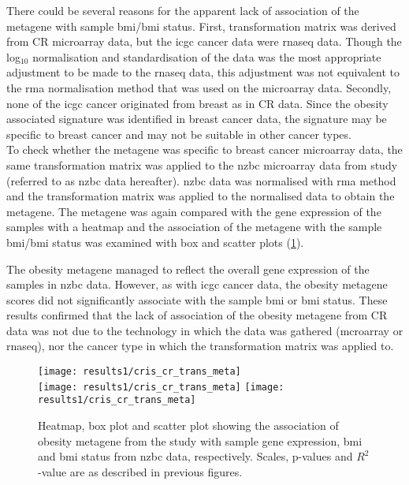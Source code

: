 There could be several reasons for the apparent lack of association of the metagene with sample \gls{bmi}/\gls{bmi} status.
First, transformation matrix was derived from CR microarray data, but the \gls{icgc} cancer data were \gls{rnaseq} data.
Though the log$_{10}$ normalisation and standardisation of the data was the most appropriate adjustment to be made to the \gls{rnaseq} data, this adjustment was not equivalent to the \gls{rma} normalisation method that was used on the microarray data.
Secondly, none of the \gls{icgc} cancer originated from breast as in CR data.
Since the obesity associated signature was identified in breast cancer data, the signature may be specific to breast cancer and may not be suitable in other cancer types.
\\

\noindent
To check whether the metagene was specific to breast cancer microarray data, the same transformation matrix was applied to the \gls{nzbc} microarray data from \citet{Print2016} study (referred to as \gls{nzbc} data hereafter).
\gls{nzbc} data was normalised with \gls{rma} method and the transformation matrix was applied to the normalised data to obtain the metagene.
The metagene was again compared with the gene expression of the samples with a heatmap and the association of the metagene with the sample \gls{bmi}/\gls{bmi} status was examined with box and scatter plots (\cref{fig:crmetaprint}).

The obesity metagene managed to reflect the overall gene expression of the samples in \gls{nzbc} data.
However, as with \gls{icgc} cancer data, the obesity metagene scores did not significantly associate with the sample \gls{bmi} or \gls{bmi} status.
These results confirmed that the lack of association of the obesity metagene from CR data was not due to the technology in which the data was gathered (mcroarray or \gls{rnaseq}), nor the cancer type in which the transformation matrix was applied to.

\begin{figure}[htp!]
	\centering
	\texttt{[image: results1/cris\_cr\_trans\_meta]}\\
	\vspace{1em}
	\texttt{[image: results1/cris\_cr\_trans\_meta]}
	\hfill
	\texttt{[image: results1/cris\_cr\_trans\_meta]}
	\caption[Obesity metagene from \citet{Creighton2012} study in \gls{nzbc} data]{Heatmap, box plot and scatter plot showing the association of obesity metagene from the \citet{Creighton2012} study with sample gene expression, \gls{bmi} and \gls{bmi} status from \gls{nzbc} data, respectively.
	Scales, p-values and $R^2$-value are as described in previous figures.}
	\label{fig:crmetaprint}
\end{figure}

